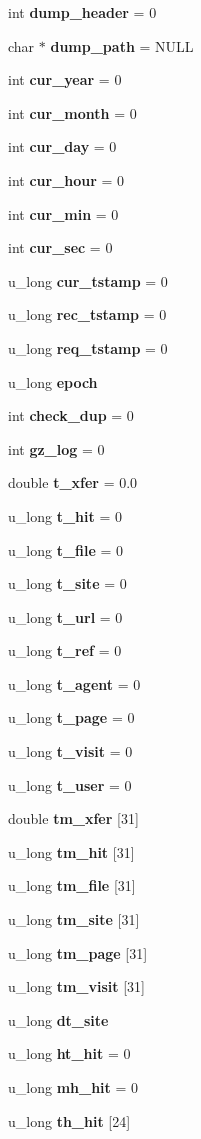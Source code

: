 \begin{CompactItemize}
\item 
int {\bf dump\_\-header} = 0
\item 
char $\ast$ {\bf dump\_\-path} = NULL
\item 
int {\bf cur\_\-year} = 0
\item 
int {\bf cur\_\-month} = 0
\item 
int {\bf cur\_\-day} = 0
\item 
int {\bf cur\_\-hour} = 0
\item 
int {\bf cur\_\-min} = 0
\item 
int {\bf cur\_\-sec} = 0
\item 
u\_\-long {\bf cur\_\-tstamp} = 0
\item 
u\_\-long {\bf rec\_\-tstamp} = 0
\item 
u\_\-long {\bf req\_\-tstamp} = 0
\item 
u\_\-long {\bf epoch}
\item 
int {\bf check\_\-dup} = 0
\item 
int {\bf gz\_\-log} = 0
\item 
double {\bf t\_\-xfer} = 0.0
\item 
u\_\-long {\bf t\_\-hit} = 0
\item 
u\_\-long {\bf t\_\-file} = 0
\item 
u\_\-long {\bf t\_\-site} = 0
\item 
u\_\-long {\bf t\_\-url} = 0
\item 
u\_\-long {\bf t\_\-ref} = 0
\item 
u\_\-long {\bf t\_\-agent} = 0
\item 
u\_\-long {\bf t\_\-page} = 0
\item 
u\_\-long {\bf t\_\-visit} = 0
\item 
u\_\-long {\bf t\_\-user} = 0
\item 
double {\bf tm\_\-xfer} [31]
\item 
u\_\-long {\bf tm\_\-hit} [31]
\item 
u\_\-long {\bf tm\_\-file} [31]
\item 
u\_\-long {\bf tm\_\-site} [31]
\item 
u\_\-long {\bf tm\_\-page} [31]
\item 
u\_\-long {\bf tm\_\-visit} [31]
\item 
u\_\-long {\bf dt\_\-site}
\item 
u\_\-long {\bf ht\_\-hit} = 0
\item 
u\_\-long {\bf mh\_\-hit} = 0
\item 
u\_\-long {\bf th\_\-hit} [24]
\item 

\end{CompactItemize}
